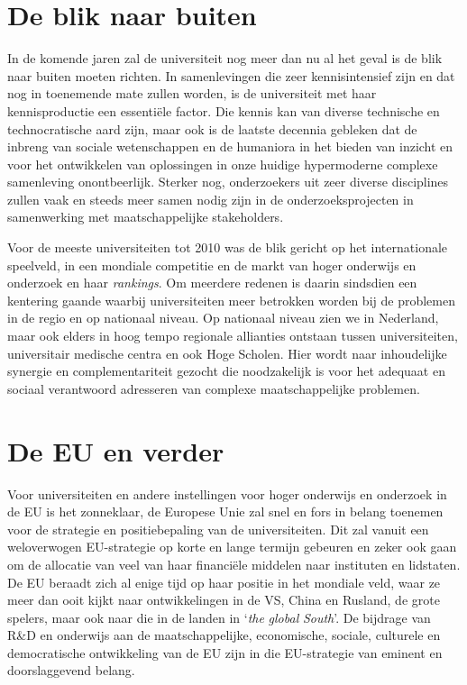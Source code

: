 \documentclass[smallauthor, chapterhaspagenum, nochapterinheader, pagenuminheader,  bigchapnum,medium2, tocpages,  garamond, titleinheader]{jote-book}
\begin{document}
	\section{De blik naar buiten}



	In de komende jaren zal de universiteit nog meer dan nu al het geval is de blik naar buiten moeten richten. In samenlevingen die zeer kennisintensief zijn en dat nog in toenemende mate zullen worden, is de universiteit met haar kennisproductie een essentiële factor. Die kennis kan van diverse technische en technocratische aard zijn, maar ook is de laatste decennia gebleken dat de inbreng van sociale wetenschappen en de humaniora in het bieden van inzicht en voor het ontwikkelen van oplossingen in onze huidige hypermoderne complexe samenleving onontbeerlijk. Sterker nog, onderzoekers uit zeer diverse disciplines zullen vaak en steeds meer samen nodig zijn in de onderzoeksprojecten in samenwerking met maatschappelijke stakeholders.



	Voor de meeste universiteiten tot 2010 was de blik gericht op het internationale speelveld, in een mondiale competitie en de markt van hoger onderwijs en onderzoek en haar \emph{rankings}. Om meerdere redenen is daarin sindsdien een kentering gaande waarbij universiteiten meer betrokken worden bij de problemen in de regio en op nationaal niveau. Op nationaal niveau zien we in Nederland, maar ook elders in hoog tempo regionale allianties ontstaan tussen universiteiten, universitair medische centra en ook Hoge Scholen. Hier wordt naar inhoudelijke synergie en complementariteit gezocht die noodzakelijk is voor het adequaat en sociaal verantwoord adresseren van complexe maatschappelijke problemen.\textbf{ }



	\section{De EU en verder }



	Voor universiteiten en andere instellingen voor hoger onderwijs en onderzoek in de EU is het zonneklaar, de Europese Unie zal snel en fors in belang toenemen voor de strategie en positiebepaling van de universiteiten. Dit zal vanuit een weloverwogen EU-strategie op korte en lange termijn gebeuren en zeker ook gaan om de allocatie van veel van haar financiële middelen naar instituten en lidstaten. De EU beraadt zich al enige tijd op haar positie in het mondiale veld, waar ze meer dan ooit kijkt naar ontwikkelingen in de VS, China en Rusland, de grote spelers, maar ook naar die in de landen in ‘\emph{the}\emph{ }\emph{global}\emph{ South}'. De bijdrage van R\&D en onderwijs aan de maatschappelijke, economische, sociale, culturele en democratische ontwikkeling van de EU zijn in die EU-strategie van eminent en doorslaggevend belang.
\end{document}
